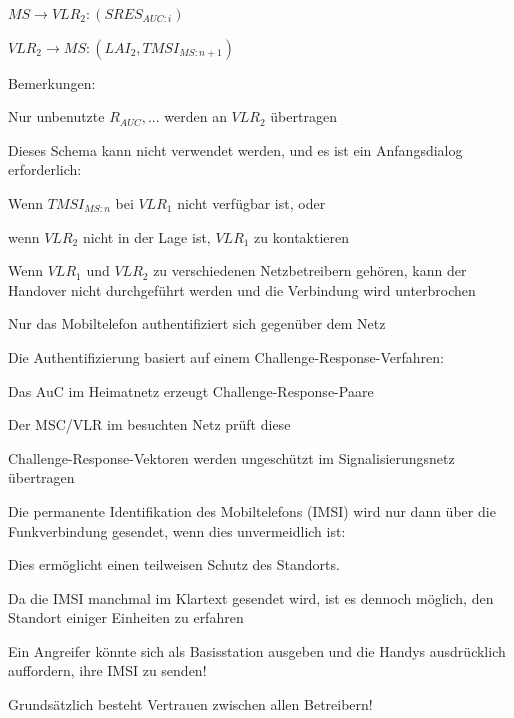 \documentclass[a4paper]{article}
\begin{document}
\begin{multicols}{3}
\begin{itemize*}
\begin{enumerate*}
                  \item $MS \rightarrow VLR_2: (SRES_{AUC:i})$
                  \item $VLR_2 \rightarrow MS: (LAI_2, TMSI_{MS:n+1})$
            \end{enumerate*}
            \item Bemerkungen:
            \begin{itemize*}
                  \item Nur unbenutzte $R_{AUC}, ...$ werden an $VLR_2$ übertragen
                  \item Dieses Schema kann nicht verwendet werden, und es ist ein Anfangsdialog erforderlich:
                  \begin{itemize*}
                        \item Wenn $TMSI_{MS:n}$ bei $VLR_1$ nicht verfügbar ist, oder
                        \item wenn $VLR_2$ nicht in der Lage ist, $VLR_1$ zu kontaktieren
                  \end{itemize*}
                  \item Wenn $VLR_1$ und $VLR_2$ zu verschiedenen Netzbetreibern gehören, kann der Handover nicht durchgeführt werden und die Verbindung wird unterbrochen
            \end{itemize*}
            \item Nur das Mobiltelefon authentifiziert sich gegenüber dem Netz
            \item Die Authentifizierung basiert auf einem Challenge-Response-Verfahren:
            \begin{itemize*}
                  \item Das AuC im Heimatnetz erzeugt Challenge-Response-Paare
                  \item Der MSC/VLR im besuchten Netz prüft diese
                  \item Challenge-Response-Vektoren werden ungeschützt im Signalisierungsnetz übertragen
            \end{itemize*}
            \item Die permanente Identifikation des Mobiltelefons (IMSI) wird nur dann über die Funkverbindung gesendet, wenn dies unvermeidlich ist:
            \begin{itemize*}
                  \item Dies ermöglicht einen teilweisen Schutz des Standorts.
                  \item Da die IMSI manchmal im Klartext gesendet wird, ist es dennoch möglich, den Standort einiger Einheiten zu erfahren
                  \item Ein Angreifer könnte sich als Basisstation ausgeben und die Handys ausdrücklich auffordern, ihre IMSI zu senden!
            \end{itemize*}
            \item Grundsätzlich besteht Vertrauen zwischen allen Betreibern!
      \end{itemize*}


\end{multicols}
\end{document}
